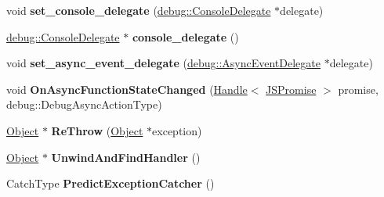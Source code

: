\begin{DoxyCompactItemize}
\item 
\mbox{\label{classv8_1_1internal_1_1Isolate_abc957626936f9b4af838391d361c70cb}} 
void {\bfseries set\+\_\+console\+\_\+delegate} (\mbox{\hyperlink{classv8_1_1debug_1_1ConsoleDelegate}{debug\+::\+Console\+Delegate}} $\ast$delegate)
\item 
\mbox{\label{classv8_1_1internal_1_1Isolate_a882f723633515de4bfb4ce6e620c7971}} 
\mbox{\hyperlink{classv8_1_1debug_1_1ConsoleDelegate}{debug\+::\+Console\+Delegate}} $\ast$ {\bfseries console\+\_\+delegate} ()
\item 
\mbox{\label{classv8_1_1internal_1_1Isolate_a34955391985c30c80e7164afbee8f97c}} 
void {\bfseries set\+\_\+async\+\_\+event\+\_\+delegate} (\mbox{\hyperlink{classv8_1_1debug_1_1AsyncEventDelegate}{debug\+::\+Async\+Event\+Delegate}} $\ast$delegate)
\item 
\mbox{\label{classv8_1_1internal_1_1Isolate_ae3ba5b9f47875a32a5fa451f60436b33}} 
void {\bfseries On\+Async\+Function\+State\+Changed} (\mbox{\hyperlink{classv8_1_1internal_1_1Handle}{Handle}}$<$ \mbox{\hyperlink{classv8_1_1internal_1_1JSPromise}{J\+S\+Promise}} $>$ promise, debug\+::\+Debug\+Async\+Action\+Type)
\item 
\mbox{\label{classv8_1_1internal_1_1Isolate_a6277e16778948b45994e81a6dbf08c35}} 
\mbox{\hyperlink{classv8_1_1internal_1_1Object}{Object}} $\ast$ {\bfseries Re\+Throw} (\mbox{\hyperlink{classv8_1_1internal_1_1Object}{Object}} $\ast$exception)
\item 
\mbox{\label{classv8_1_1internal_1_1Isolate_a47e06d6b1e3bf40a714b55f053ff398e}} 
\mbox{\hyperlink{classv8_1_1internal_1_1Object}{Object}} $\ast$ {\bfseries Unwind\+And\+Find\+Handler} ()
\item 
\mbox{\label{classv8_1_1internal_1_1Isolate_ade7b738b6a9cecb8ac1a1bd9ec6a08e7}} 
Catch\+Type {\bfseries Predict\+Exception\+Catcher} ()
\item 
\mbox{\label{classv8_1_1internal_1_1Isolate_a6d92f29b935a66b2dfd1ba29d61bdb4c}} 

\end{DoxyCompactItemize}
